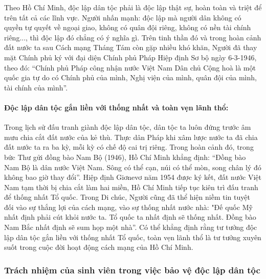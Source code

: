 Theo Hồ Chí Minh, độc lập dân tộc phải là độc lập thật sự, hoàn toàn và triệt để trên tất cả các lĩnh vực. Người nhấn mạnh: độc lập mà người dân không có quyền tự quyết về ngoại giao, không có quân đội riêng, không có nền tài chính riêng..., thì độc lập đó chẳng có ý nghĩa gì. Trên tinh thần đó và trong hoàn cảnh đất nước ta sau Cách mạng Tháng Tám còn gặp nhiều khó khăn, Người đã thay mặt Chính phủ ký với đại diện Chính phủ Pháp Hiệp định Sơ bộ ngày 6-3-1946, theo đó: “Chính phủ Pháp công nhận nước Việt Nam Dân chủ Cộng hoà là một quốc gia tự do có Chính phủ của mình, Nghị viện của mình, quân đội của mình, tài chính của mình”.

\paragraph{Độc lập dân tộc gắn liền với thống nhất và toàn vẹn lãnh thổ:}
Trong lịch sử đấu tranh giành độc lập dân tộc, dân tộc ta luôn đứng trước âm mưu chia cắt đất nước của kẻ thù. Thực dân Pháp khi xâm lược nước ta đã chia đất nước ta ra ba kỳ, mỗi kỳ có chế độ cai trị riêng. Trong hoàn cảnh đó, trong bức Thư gửi đồng bào Nam Bộ (1946), Hồ Chí Minh khẳng định: “Đồng bào Nam Bộ là dân nước Việt Nam. Sông có thể cạn, núi có thể mòn, song chân lý đó không bao giờ thay đổi”. Hiệp định Giơnevơ năm 1954 được ký kết, đất nước Việt Nam tạm thời bị chia cắt làm hai miền, Hồ Chí Minh tiếp tục kiên trì đấu tranh để thống nhất Tổ quốc. Trong Di chúc, Người cũng đã thể hiện niềm tin tuyệt đối vào sự thắng lợi của cách mạng, vào sự thống nhất nước nhà: "Đế quốc Mỹ nhất định phải cút khỏi nước ta. Tổ quốc ta nhất định sẽ thống nhất. Đồng bào Nam Bắc nhất định sẽ sum họp một nhà”. Có thể khẳng định rằng tư tưởng độc lập dân tộc gắn liền với thống nhất Tổ quốc, toàn vẹn lãnh thổ là tư tưởng xuyên suốt trong cuộc đời hoạt động cách mạng của Hồ Chí Minh.

\subsubsection{Trách nhiệm của sinh viên trong việc bảo vệ độc lập dân tộc}

